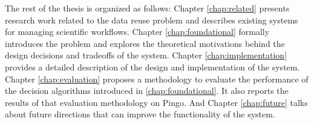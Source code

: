 The rest of the thesis is organized as follows: Chapter \ref{chap:related} presents research work related to the data reuse problem and describes existing systems for managing scientific workflows.  Chapter \ref{chap:foundational} formally introduces the problem and explores the theoretical motivations behind the design decisions and tradeoffs of the system. Chapter \ref{chap:implementation} provides a detailed description of the design and implementation of the system.  Chapter \ref{chap:evaluation} proposes a methodology to evaluate the performance of the decision algorithms introduced in \ref{chap:foundational}.  It also reports the results of that evaluation methodology on Pingo.  And Chapter \ref{chap:future} talks about future directions that can improve the functionality of the system.
